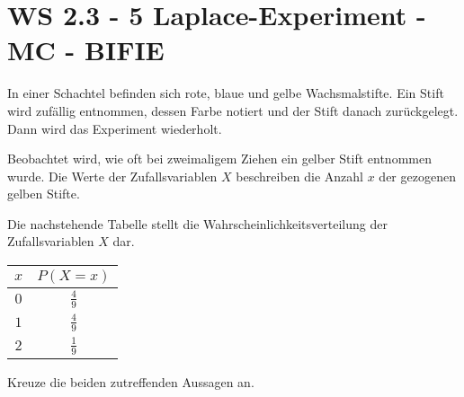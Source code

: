 \section{WS 2.3 - 5 Laplace-Experiment - MC - BIFIE}

\begin{beispiel}[WS 2.3]{1}
In einer Schachtel befinden sich rote, blaue und gelbe Wachsmalstifte. Ein Stift wird zufällig entnommen, dessen Farbe notiert und der Stift danach zurückgelegt. Dann wird das Experiment wiederholt.

Beobachtet wird, wie oft bei zweimaligem Ziehen ein gelber Stift entnommen wurde. Die Werte der Zufallsvariablen $X$ beschreiben die Anzahl $x$ der gezogenen gelben Stifte.

Die nachstehende Tabelle stellt die Wahrscheinlichkeitsverteilung der Zufallsvariablen $X$ dar.

\renewcommand{\arraystretch}{1.4}
\begin{center}
\begin{tabular}{|c|c|} \hline
$x$ & $P(X=x)$ \\ \hline
$0$ & $\frac{4}{9}$ \\ \hline
$1$ & $\frac{4}{9}$ \\ \hline
$2$ & $\frac{1}{9}$ \\ \hline
\end{tabular}
\end{center}

\leer

Kreuze die beiden zutreffenden Aussagen an.

\end{beispiel}
